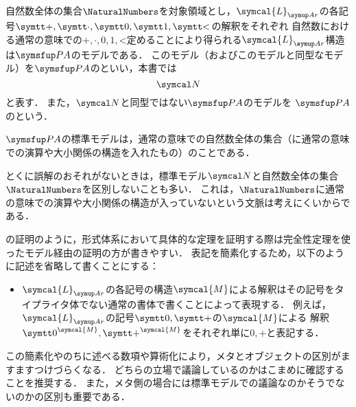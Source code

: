 \begin{Def} \label{Def:standardstructure}
	自然数全体の集合\(\NaturalNumbers\)を対象領域とし，\(\symcal{L}_{\Ar}\)の各記号\(\obj{+}, \obj{\cdot}, \obj{0}, \obj{1}, \obj{<}\)の解釈をそれぞれ
	自然数における通常の意味での\(\mathord{+}, \mathord{\cdot}, 0, 1, \mathord{<}\)定めることにより得られる\(\symcal{L}_{\Ar}\)構造は\(\PA\)のモデルである．
	このモデル（およびこのモデルと同型なモデル）を\(\PA\)のといい，本書では
	\begin{equation}
		\standardmodel
		\label{eq:standardmodel}
	\end{equation}
	と表す．
	また，\(\standardmodel\)と同型ではない\(\PA\)のモデルを
	\(\PA\)のという．

	\(\PA\)の標準モデルは，通常の意味での自然数全体の集合（に通常の意味での演算や大小関係の構造を入れたもの）のことである．
\end{Def}

\begin{Note}
	とくに誤解のおそれがないときは，標準モデル\(\standardmodel\)と自然数全体の集合\(\NaturalNumbers\)を区別しないことも多い．
	これは，\(\NaturalNumbers\)に通常の意味での演算や大小関係の構造が入っていないという文脈は考えにくいからである．
\end{Note}

\begin{Note}
	の証明のように，形式体系において具体的な定理を証明する際は完全性定理を使ったモデル経由の証明の方が書きやすい．
	表記を簡素化するため，以下のように記述を省略して書くことにする：
	\begin{itemize}
		\item \(\symcal{L}_{\Ar}\)の各記号の構造\(\symcal{M}\)による解釈はその記号をタイプライタ体でない通常の書体で書くことによって表現する．
		      例えば，\(\symcal{L}_{\Ar}\)の記号\(\obj{0}, \obj{+}\)の\(\symcal{M}\)による
		      解釈\(\interpretation{\symcal{M}}{\obj{0}}, \interpretation{\symcal{M}}{\obj{+}}\)をそれぞれ単に\(0, +\)と表記する．
	\end{itemize}

	この簡素化やのちに述べる数項や算術化により，メタとオブジェクトの区別がますますつけづらくなる．
	どちらの立場で議論しているのかはこまめに確認することを推奨する．
	また，メタ側の場合には標準モデルでの議論なのかそうでないのかの区別も重要である．
\end{Note}



